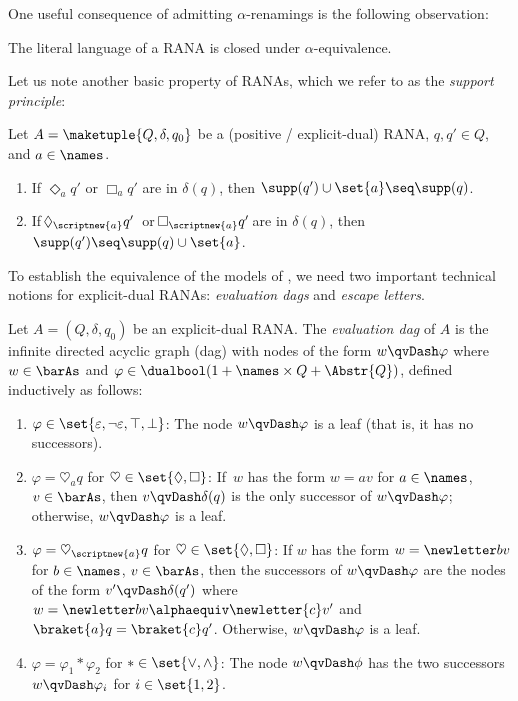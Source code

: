 \documentclass[10pt, final, conference, a4paper, twocolumn]{IEEEtran}
\begin{document}
One useful consequence of admitting $\alpha$-renamings is the following observation:
\begin{lem}\label{lem:closurealph}
  The literal language of a RANA is closed
  under $\alpha$-equivalence.
\end{lem}

Let us note another basic property of RANAs, which we refer to as the \emph{support principle}:
\begin{lem}\label{lem:suppRANA}
  Let $A = \maketuple{Q,\delta,q_0}$ be a (positive / explicit-dual) RANA,
  $q, q' \in Q$, and $a \in \names$.
  \begin{enumerate}%
    \item\label{lem:suppRANA:free} If $\Diamond_a q'$
      or $\Box_a q'$ are in $\delta(q)$,
      then $\supp(q') \cup \set{a} \seq \supp(q)$.
    \item\label{lem:suppRANA:bar} If\,$\Diamond_{\scriptnew{a}}q'$\,%
      or\,$\Box_{\scriptnew{a}}q'$\,are in $\delta(q)$, then $\supp(q'){\seq}\supp(q) \cup
      \set{a}$.%
  \end{enumerate}
\end{lem}

To establish the equivalence of the models of , we need two important
technical notions for explicit-dual RANAs: \emph{evaluation dags} and \emph{escape letters}.
\begin{defn}\label{defn:reachtree} Let $A=(Q,\delta,q_0)$ be an explicit-dual RANA. The \emph{evaluation dag} of $A$ is the infinite
    directed acyclic graph (dag) with nodes
    of the form $w \qvDash \varphi$ where
    $w \in \barAs$ and $\varphi\in\dualbool(1 + \names \times Q + \Abstr{Q})$, defined inductively as follows:
      \begin{enumerate}
      \item
        $\varphi \in \set{\varepsilon, \neg\varepsilon, \top,
          \bot}$: The node $w \qvDash \varphi$ is a leaf (that is, it has no successors).
      \item $\varphi = \heartsuit_a q$ for
        $\heartsuit \in \set{\Diamond, \Box}$: If~$w$ has the form
        $w = av$ for $a\in\names$, $v\in\barAs$, then
        $v \qvDash \delta(q)$ is the only successor of
        $w \qvDash \varphi$; otherwise, $w \qvDash \varphi$ is
        a leaf.
      \item $\varphi = \heartsuit_{\scriptnew{a}} q$ for
        $\heartsuit \in \set{\Diamond, \Box}$: If $w$ has the form
        $w=\newletter b v$ for $b\in\names$, $v\in\barAs$, then the
        successors of $w \qvDash \varphi$ are the nodes of the form
        $v' \qvDash \delta(q')$ where
        $w=\newletter b v \alphaequiv \newletter{c}v'$ and
        $\braket{a}q = \braket{c}q'$. Otherwise,
        $w \qvDash \varphi$ is a leaf.
      \item$\varphi = \varphi_1 \ast \varphi_2$ for
        $\ast\in\set{\vee,\wedge}$: The node $w\qvDash \phi$ has the two successors
        $w\qvDash\varphi_i$ for $i \in \set{1,2}$.
      \end{enumerate}
    \end{defn}
\end{document}
